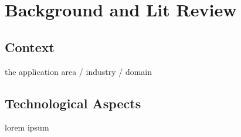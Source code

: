 \chapter{Background and Lit Review}

\section{Context}
  the application area / industry / domain

\section{Technological Aspects}
  lorem ipsum
